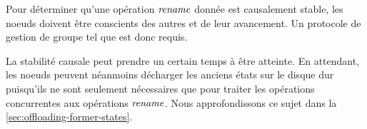 Pour déterminer qu'une opération $\mathit{rename}$ donnée est causalement stable, les noeuds doivent être conscients des autres et de leur avancement.
Un protocole de gestion de groupe tel que \cite{swim2002,lifeguard2018} est donc requis.

La stabilité causale peut prendre un certain temps à être atteinte.
En attendant, les noeuds peuvent néanmoins décharger les anciens états sur le disque dur puisqu'ils ne sont seulement nécessaires que pour traiter les opérations concurrentes aux opérations $\mathit{rename}$.
Nous approfondissons ce sujet dans la \autoref{sec:offloading-former-states}.
